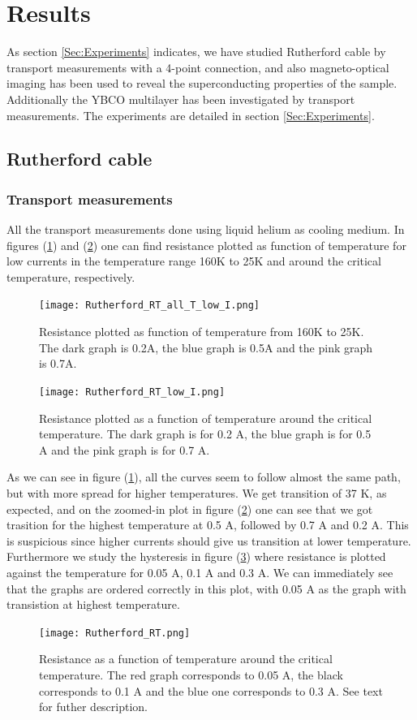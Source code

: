\documentclass{comjnl}
\begin{document}
\section{Results}\label{Sec:Results}
As section \ref{Sec:Experiments} indicates, we have studied Rutherford cable by transport measurements with a 4-point connection, and also magneto-optical imaging has been used to reveal the superconducting properties of the sample. Additionally the YBCO multilayer has been investigated by transport measurements. The experiments are detailed in section \ref{Sec:Experiments}.

\subsection{Rutherford cable}
\subsubsection{Transport measurements}
All the transport measurements done using liquid helium as cooling medium. In figures (\ref{fig:rutherfordRTallI}) and (\ref{fig:rutherfordRTlowI}) one can find resistance plotted as function of temperature for low currents in the temperature range 160K to 25K and around the critical temperature, respectively. 
\begin{figure}[h]
\centering
\texttt{[image: Rutherford\_RT\_all\_T\_low\_I.png]}
\caption{Resistance plotted as function of temperature from 160K to 25K. The dark graph is 0.2A, the blue graph is 0.5A and the pink graph is 0.7A. \label{fig:rutherfordRTallI}}
\end{figure}
\begin{figure}[h]
\centering
\texttt{[image: Rutherford\_RT\_low\_I.png]}
\caption{Resistance plotted as a function of temperature around the critical temperature. The dark graph is for 0.2 A, the blue graph is for 0.5 A and the pink graph is for 0.7 A. \label{fig:rutherfordRTlowI}}
\end{figure}
As we can see in figure (\ref{fig:rutherfordRTallI}), all the curves seem to follow almost the same path, but with more spread for higher temperatures. We get transition of 37 K, as expected, and on the zoomed-in plot in figure (\ref{fig:rutherfordRTlowI}) one can see that we got trasition for the highest temperature at 0.5 A, followed by 0.7 A and 0.2 A. This is suspicious since higher currents should give us transition at lower temperature. Furthermore we study the hysteresis in figure (\ref{fig:rutherfordRT}) where resistance is plotted against the temperature for 0.05 A, 0.1 A and 0.3 A. We can immediately see that the graphs are ordered correctly in this plot, with 0.05 A as the graph with transistion at highest temperature.
\begin{figure}[h]
\centering
\texttt{[image: Rutherford\_RT.png]}
\caption{Resistance as a function of temperature around the critical temperature. The red graph corresponds to 0.05 A, the black corresponds to 0.1 A and the blue one corresponds to 0.3 A. See text for futher description. \label{fig:rutherfordRT}}
\end{figure}
\end{document}
